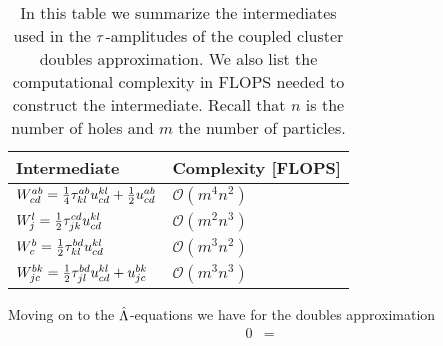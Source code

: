         \begin{table}
            \centering
            \caption{In this table we summarize the intermediates used in
            the $\tau$-amplitudes of the coupled cluster doubles approximation. We
            also list the computational complexity in FLOPS needed to construct
            the intermediate. Recall that $n$ is the number of holes and $m$ the
            number of particles.}
            \renewcommand{\arraystretch}{1.3}
            \begin{tabular}{@{}ll@{}}
                \toprule
                Intermediate & Complexity [FLOPS] \\
                \midrule
                $W^{ab}_{cd}
                = \frac{1}{4} \tau^{ab}_{kl} u^{kl}_{cd}
                + \frac{1}{2} u^{ab}_{cd}$
                &
                $\mathcal{O}(m^4 n^2)$ \\
                \addlinespace
                $W^{l}_{j}
                = \frac{1}{2} \tau^{cd}_{jk} u^{kl}_{cd}$
                &
                $\mathcal{O}(m^2 n^3)$
                \\
                \addlinespace
                $W^{b}_{c}
                = \frac{1}{2} \tau^{bd}_{kl} u^{kl}_{cd}$
                &
                $\mathcal{O}(m^3 n^2)$
                \\
                \addlinespace
                $W^{bk}_{jc}
                = \frac{1}{2} \tau^{bd}_{jl} u^{kl}_{cd}
                + u^{bk}_{jc}$
                &
                $\mathcal{O}(m^3n^3)$
                \\
                \bottomrule
            \end{tabular}
            \label{tab:intermediates_ccd}
        \end{table}
        Moving on to the $\hat{\Lambda}$-equations we have for the doubles
        approximation
        \begin{align}
            0 &=
        \end{align}

